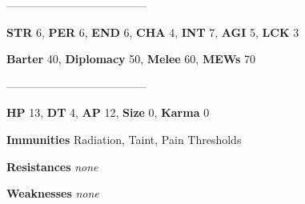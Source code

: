 \documentclass[11pt,a4paper,twocolumn]{book}
\begin{document}
--------------------------------------

\noindent
\textbf{STR} 6, \textbf{PER} 6, \textbf{END} 6, \textbf{CHA} 4, \textbf{INT} 7, \textbf{AGI} 5, \textbf{LCK} 3

\noindent
\textbf{Barter} 40, \textbf{Diplomacy} 50, \textbf{Melee} 60, \textbf{MEWs} 70

--------------------------------------

\noindent
\textbf{HP} 13, \textbf{DT} 4, \textbf{AP} 12, \textbf{Size} 0, \textbf{Karma} 0


\noindent
\textbf{Immunities} Radiation, Taint, Pain Thresholds

\noindent
\textbf{Resistances} \emph{none} %

\noindent
\textbf{Weaknesses} \emph{none}%
\end{document}
